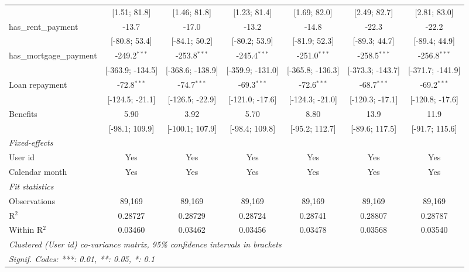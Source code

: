 \begin{table}[htbp]
\begin{threeparttable}[b]
\begin{tabular}{lcccccc}
                                   & [1.51; 81.8]     & [1.46; 81.8]     & [1.23; 81.4]     & [1.69; 82.0]     & [2.49; 82.7]     & [2.81; 83.0]\\   
         has\_rent\_payment        & -13.7            & -17.0            & -13.2            & -14.8            & -22.3            & -22.2\\   
                                   & [-80.8; 53.4]    & [-84.1; 50.2]    & [-80.2; 53.9]    & [-81.9; 52.3]    & [-89.3; 44.7]    & [-89.4; 44.9]\\   
         has\_mortgage\_payment    & -249.2$^{***}$   & -253.8$^{***}$   & -245.4$^{***}$   & -251.0$^{***}$   & -258.5$^{***}$   & -256.8$^{***}$\\   
                                   & [-363.9; -134.5] & [-368.6; -138.9] & [-359.9; -131.0] & [-365.8; -136.3] & [-373.3; -143.7] & [-371.7; -141.9]\\   
         Loan repayment            & -72.8$^{***}$    & -74.7$^{***}$    & -69.3$^{***}$    & -72.6$^{***}$    & -68.7$^{***}$    & -69.2$^{***}$\\   
                                   & [-124.5; -21.1]  & [-126.5; -22.9]  & [-121.0; -17.6]  & [-124.3; -21.0]  & [-120.3; -17.1]  & [-120.8; -17.6]\\   
         Benefits                  & 5.90             & 3.92             & 5.70             & 8.80             & 13.9             & 11.9\\   
                                   & [-98.1; 109.9]   & [-100.1; 107.9]  & [-98.4; 109.8]   & [-95.2; 112.7]   & [-89.6; 117.5]   & [-91.7; 115.6]\\   
         \midrule
         \emph{Fixed-effects}\\
         User id                   & Yes              & Yes              & Yes              & Yes              & Yes              & Yes\\  
         Calendar month            & Yes              & Yes              & Yes              & Yes              & Yes              & Yes\\  
         \midrule
         \emph{Fit statistics}\\
         Observations              & 89,169           & 89,169           & 89,169           & 89,169           & 89,169           & 89,169\\  
         R$^2$                     & 0.28727          & 0.28729          & 0.28724          & 0.28741          & 0.28807          & 0.28787\\  
         Within R$^2$              & 0.03460          & 0.03462          & 0.03456          & 0.03478          & 0.03568          & 0.03540\\  
         \midrule \midrule
         \multicolumn{7}{l}{\emph{Clustered (User id) co-variance matrix, 95\% confidence intervals in brackets}}\\
         \multicolumn{7}{l}{\emph{Signif. Codes: ***: 0.01, **: 0.05, *: 0.1}}\\
      \end{tabular}
      

\end{threeparttable}
\end{table}
